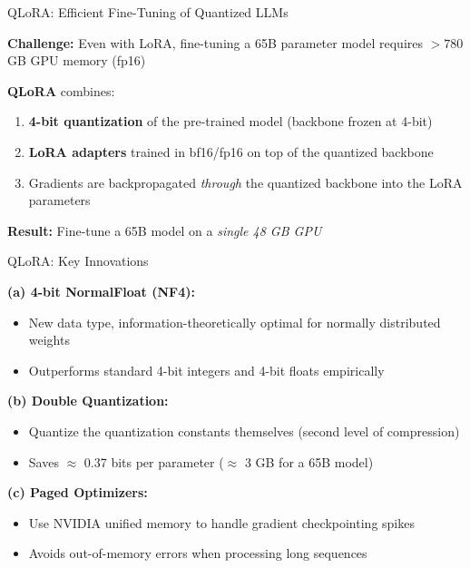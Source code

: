 \documentclass[11pt,compress,t,notes=noshow, xcolor=table]{beamer}
\begin{document}

\begin{frame}{QLoRA: Efficient Fine-Tuning of Quantized LLMs}

\vfill

\textbf{Challenge:} Even with LoRA, fine-tuning a 65B parameter model requires $> 780$ GB GPU memory (fp16)

\vfill

\textbf{QLoRA}  combines:
\begin{enumerate}
  \item \textbf{4-bit quantization} of the pre-trained model (backbone frozen at 4-bit)
  \item \textbf{LoRA adapters} trained in bf16/fp16 on top of the quantized backbone
  \item Gradients are backpropagated \textit{through} the quantized backbone into the LoRA parameters
\end{enumerate}

\vfill

\textbf{Result:} Fine-tune a 65B model on a \textit{single 48 GB GPU}

\vfill

\end{frame}


\begin{frame}{QLoRA: Key Innovations}

\vfill

\textbf{(a) 4-bit NormalFloat (NF4):}
\begin{itemize}
  \item New data type, information-theoretically optimal for normally distributed weights
  \item Outperforms standard 4-bit integers and 4-bit floats empirically
\end{itemize}

\vfill

\textbf{(b) Double Quantization:}
\begin{itemize}
  \item Quantize the quantization constants themselves (second level of compression)
  \item Saves $\approx$ 0.37 bits per parameter ($\approx$ 3 GB for a 65B model)
\end{itemize}

\vfill

\textbf{(c) Paged Optimizers:}
\begin{itemize}
  \item Use NVIDIA unified memory to handle gradient checkpointing spikes
  \item Avoids out-of-memory errors when processing long sequences
\end{itemize}

\vfill

\end{frame}
\end{document}
